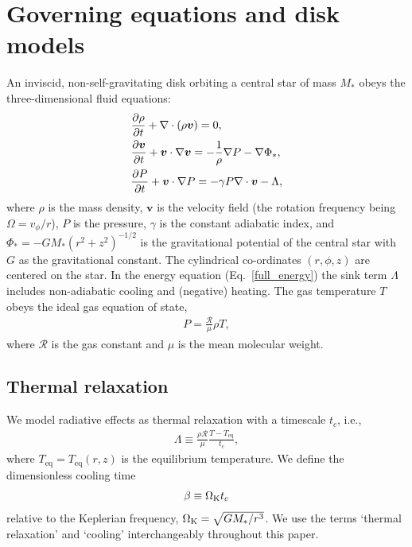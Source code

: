 \section{Governing equations and disk models}\label{setup}
An inviscid, non-self-gravitating disk orbiting a central star of mass $M_*$
obeys the three-dimensional fluid equations:
\begin{align}
  &\frac{\p\rho}{\p t} + \nabla\cdot{\left(\rho\bm{v}\right)} = 0,\label{full_mass}\\
  &\frac{\p\bm{v}}{\p t} + \bm{v}\cdot\nabla\bm{v} =
  -\frac{1}{\rho}\nabla P - \nabla\Phi_*,\\
  &\frac{\p P}{\p t} + \bm{v}\cdot\nabla P  = - \gamma P
  \nabla\cdot\bm{v} - \Lambda %
  , \label{full_energy}
\end{align}
where $\rho$ is the mass density, $\bm{v}$ is the velocity field (the
rotation frequency being $\Omega=v_\phi/r$), $P$
is the pressure, $\gamma$ is the constant adiabatic index, and $\Phi_*
= -GM_*(r^2 + z^2)^{-1/2}$ is the gravitational potential of the
central star with $G$ as the gravitational constant. The cylindrical
co-ordinates $(r,\phi, z)$ are centered on the star. 
In the energy equation (Eq.\ \ref{full_energy}) the sink term
$\Lambda$ includes non-adiabatic cooling and (negative) heating. 
The gas temperature $T$ obeys the ideal gas 
equation of state,  
\begin{align}
P = \frac{\mathcal{R}}{\mu}\rho T,
\end{align}
where $\mathcal{R}$ is the gas constant and $\mu$ is the mean molecular
weight.    

\subsection{Thermal relaxation}
We model radiative effects as thermal
relaxation with a timescale $t_c$, i.e.,
\begin{align}\label{thermal_relax}
  \Lambda  \equiv \frac{\rho\mathcal{R}}{\mu}\frac{T - T_\mathrm{eq}}{t_c},
\end{align}
where $T_\mathrm{eq}=T_\mathrm{eq}(r,z)$ is the equilibrium temperature.  We 
define the dimensionless cooling time 
\begin{align}\label{beta_def}
  \beta \equiv \Omega_{\rm K} t_c
\end{align}
relative to the Keplerian frequency, $\Omega_{\rm K}=\sqrt{GM_*/r^3}$.  We 
use the terms `thermal relaxation' and `cooling' interchangeably
throughout this paper.   

